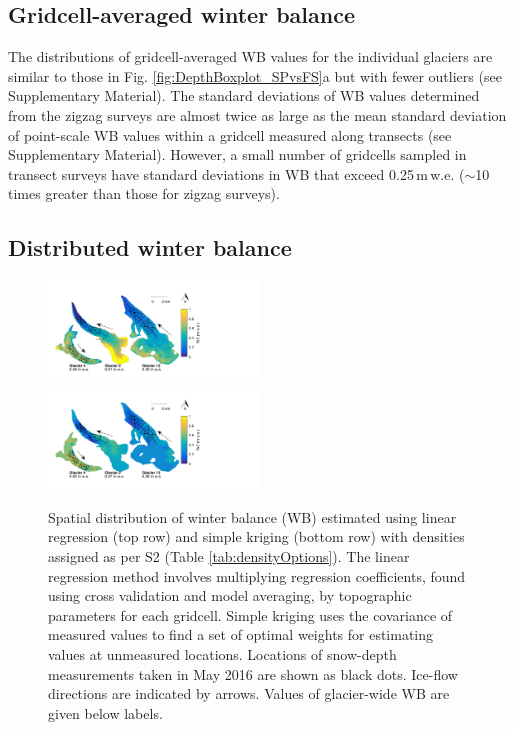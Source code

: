 \documentclass[twocolumn, letterpaper]{igs}
\begin{document}
\subsection{Gridcell-averaged winter balance}

The distributions of gridcell-averaged WB values for the individual glaciers are similar to those in Fig. \ref{fig:DepthBoxplot_SPvsFS}a but with fewer outliers (see Supplementary Material). The standard deviations of WB values determined from the zigzag surveys are almost twice as large as the mean standard deviation of point-scale WB values within a gridcell measured along transects (see Supplementary Material). However, a small number of gridcells sampled in transect surveys have standard deviations in WB that exceed 0.25\,m\,w.e. ($\sim$10 times greater than those for zigzag surveys). 

\subsection{Distributed winter balance}

\begin{figure}
	\centering
	\includegraphics[width =0.5\textwidth]{LR_map.pdf}\\
    \includegraphics[width =0.5\textwidth]{SK_map.pdf}\\
	\caption{Spatial distribution of winter balance (WB) estimated using linear regression (top row) and simple kriging (bottom row) with densities assigned as per S2 (Table \ref{tab:densityOptions}). The linear regression method involves multiplying regression coefficients, found using cross validation and model averaging, by topographic parameters for each gridcell. Simple kriging uses the covariance of measured values to find a set of optimal weights for estimating values at unmeasured locations. Locations of snow-depth measurements taken in May 2016 are shown as black dots. Ice-flow directions are indicated by arrows. Values of glacier-wide WB are given below labels.}
	\label{fig:LR_SK_map}
\end{figure}
\end{document}

